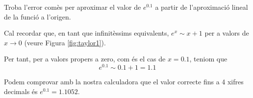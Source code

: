 \Exercise Troba l'error comès per aproximar el valor de $e^0.1$ a partir de l'aproximació lineal de la funció a l'origen. 
\label{ex:taylor1}
\Answer

Cal recordar que, en tant que infinitèssims equivalents,  $e^x \sim x+1$ per a valors de $x\rightarrow0$ (veure Figura \ref{fig:taylor1}).

\begin{center}
  \begin{minipage}{9cm}
    \label{fig:taylor1}
  \end{minipage} 
  \end{center}

  Per tant, per a valors propers a zero, com és el cas de $x=0.1$, teniom que
  \[e^{0.1} \sim 0.1 +1 = 1.1\]

  Podem comprovar amb la nostra calculadora que el valor correcte fins a 4 xifres decimals és $e^{0.1}=1.1052$.


\blacksquare 